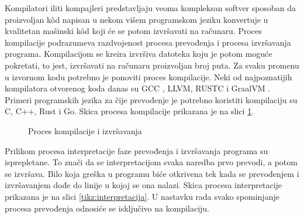 \documentclass[12pt,oneside]{memoir}
\begin{document}
Kompilatori iliti kompajleri predstavljaju veoma kompleksan softver sposoban da proizvoljan k\^od napisan u nekom višem programskom jeziku konvertuje u kvalitetan mašinski k\^od koji će se potom izvršavati na računaru. Proces kompilacije podrazumeva razdvojenost procesa prevođenja i procesa izvršavanja programa. Kompilacijom se kreira izvršiva datoteka koju je potom moguće pokretati, to jest, izvršavati na računaru proizvoljan broj puta. Za svaku promenu u izvornom kodu potrebno je ponoviti proces kompilacije. Neki od najpoznatijih kompilatora otvorenog koda danas su GCC \cite{gcc}, LLVM, RUSTC \cite{rustc} i GraalVM \cite{graalvm}. Primeri programskih jezika za čije prevođenje je potrebno koristiti kompilaciju su C, C++, Rust i Go. Skica procesa kompilacije prikazana je na slici \ref{tikz:kompilacija}.

\begin{figure}
\centering

\caption{Proces kompilacije i izvršavanja}
\label{tikz:kompilacija}
\end{figure}


Prilikom procesa interpretacije faze prevođenja i izvršavanja programa su 
isprepletane. To znači da se interpretacijom svaka naredba prvo prevodi, a potom se izvršava. 
Bilo koja greška u programu biće otkrivena tek kada se prevođenjem i izvršavanjem dođe do linije u kojoj se ona nalazi. Skica procesa interpretacije prikazana je na slici \ref{tikz:interpretacija}. U nastavku rada svako spominjanje procesa prevođenja odnosiće se isključivo na kompilaciju.
\end{document}
